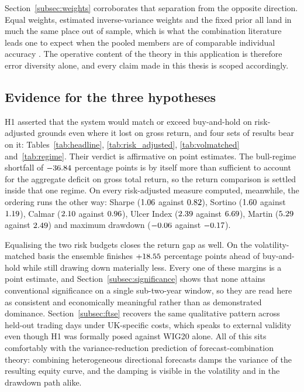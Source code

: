 Section~\ref{subsec:weights} corroborates that separation from the opposite direction. Equal weights, estimated inverse-variance weights and the fixed prior all land in much the same place out of sample, which is what the combination literature leads one to expect when the pooled members are of comparable individual accuracy \cite{clemen1989,smithwallis2009}. The operative content of the theory in this application is therefore error diversity alone, and every claim made in this thesis is scoped accordingly.

\subsection{Evidence for the three hypotheses}\label{subsec:hypotheses_evidence}

H1 asserted that the system would match or exceed buy-and-hold on risk-adjusted grounds even where it lost on gross return, and four sets of results bear on it: Tables~\ref{tab:headline}, \ref{tab:risk_adjusted}, \ref{tab:volmatched} and~\ref{tab:regime}. Their verdict is affirmative on point estimates. The bull-regime shortfall of $-36.84{}$ percentage points is by itself more than sufficient to account for the aggregate deficit on gross total return, so the return comparison is settled inside that one regime. On every risk-adjusted measure computed, meanwhile, the ordering runs the other way: Sharpe ($1.06{}$ against $0.82{}$), Sortino ($1.60{}$ against $1.19{}$), Calmar ($2.10{}$ against $0.96{}$), Ulcer Index ($2.39{}$ against $6.69{}$), Martin ($5.29{}$ against $2.49{}$) and maximum drawdown ($-0.06{}$ against $-0.17{}$).

Equalising the two risk budgets closes the return gap as well. On the volatility-matched basis the ensemble finishes $+18.55{}$ percentage points ahead of buy-and-hold while still drawing down materially less. Every one of these margins is a point estimate, and Section~\ref{subsec:significance} shows that none attains conventional significance on a single sub-two-year window, so they are read here as consistent and economically meaningful rather than as demonstrated dominance. Section~\ref{subsec:ftse} recovers the same qualitative pattern across \FtseOOSDays{} held-out trading days under UK-specific costs, which speaks to external validity even though H1 was formally posed against WIG20 alone. All of this sits comfortably with the variance-reduction prediction of forecast-combination theory: combining heterogeneous directional forecasts damps the variance of the resulting equity curve, and the damping is visible in the volatility and in the drawdown path alike.

